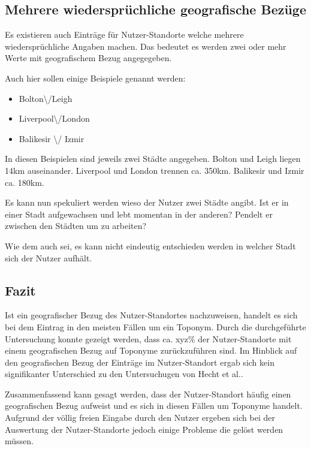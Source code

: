 		\subsection{Mehrere wiedersprüchliche geografische Bezüge} \label{subsec:wiederspruechlicheBezuege} 

			Es existieren auch Einträge für Nutzer-Standorte welche mehrere wiedersprüchliche Angaben machen.
			Das bedeutet es werden zwei oder mehr Werte mit geografischem Bezug angegegeben.

			Auch hier sollen einige Beispiele genannt werden:

			\begin{itemize}
				\item Bolton\textbackslash/Leigh
				\item Liverpool\textbackslash/London
				\item  Balikesir \textbackslash/ Izmir	
			\end{itemize}							
				
			In diesen Beispielen sind jeweils zwei Städte angegeben.
			Bolton und Leigh liegen 14km auseinander.
			Liverpool und London trennen ca. 350km.
			Balikesir und Izmir ca. 180km.

			Es kann nun spekuliert werden wieso der Nutzer zwei Städte angibt.
			Ist er in einer Stadt aufgewachsen und lebt momentan in der anderen?
			Pendelt er zwischen den Städten um zu arbeiten?

			Wie dem auch sei, es kann nicht eindeutig entschieden werden in welcher Stadt sich der Nutzer aufhält.
			

		\subsection{Fazit}

			Ist ein geografischer Bezug des Nutzer-Standortes nachzuweisen, handelt es sich bei dem Eintrag in den meisten Fällen um ein Toponym.
			Durch die durchgeführte Untersuchung konnte gezeigt werden, dass ca. xyz\% der Nutzer-Standorte mit einem geografischen Bezug auf Toponyme zurückzuführen sind.
			Im Hinblick auf den geografischen Bezug der Einträge im Nutzer-Standort ergab sich kein signifikanter Unterschied zu den Untersuchugen von Hecht et al..

			Zusammenfassend kann gesagt werden, dass der Nutzer-Standort häufig einen geografischen Bezug aufweist und es sich in diesen Fällen um Toponyme handelt.
			Aufgrund der völlig freien Eingabe durch den Nutzer ergeben sich bei der Auswertung der Nutzer-Standorte jedoch einige Probleme die gelöst werden müssen.



